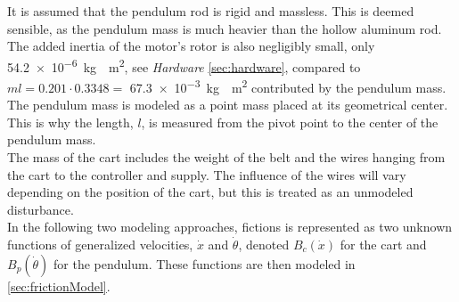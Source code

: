 It is assumed that the pendulum rod is rigid and massless. This is deemed sensible, as the pendulum mass is much heavier than the hollow aluminum rod. The added inertia of the motor's rotor is also negligibly small, only \SI{54.2e-6}{kg\cdot m^2}, see \textit{Hardware} \autoref{sec:hardware}, compared to $ml = 0.201 \cdot 0.3348=$ \SI{67.3e-3}{kg\cdot m^2} contributed by the pendulum mass. The pendulum mass is modeled as a point mass placed at its geometrical center. This is why the length, $l$, is measured from the pivot point to the center of the pendulum mass.\\
The mass of the cart includes the weight of the belt and the wires hanging from the cart to the controller and supply. The influence of the wires will vary depending on the position of the cart, but this is treated as an unmodeled disturbance.\\
In the following two modeling approaches, fictions is represented as two unknown functions of generalized velocities, $\dot{x}$ and $\dot{\theta}$, denoted $B_c(\dot{x})$ for the cart and $B_p(\dot{\theta})$ for the pendulum. These functions are then modeled in \autoref{sec:frictionModel}.




